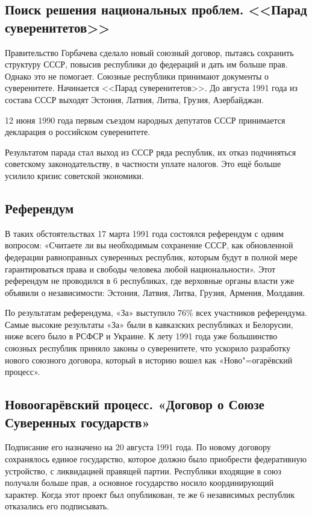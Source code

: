 \subsection{Поиск решения национальных проблем. <<Парад суверенитетов>>}
Правительство Горбачева сделало новый союзный договор, пытаясь сохранить структуру СССР, повысив республики до федераций и дать им больше прав. Однако это не помогает. Союзные республики принимают документы о суверенитете. Начинается <<Парад суверенитетов>>. До августа 1991 года из состава СССР выходят Эстония, Латвия, Литва, Грузия, Азербайджан. 

12 июня 1990 года первым съездом народных депутатов СССР принимается декларация о российском суверенитете.

Результатом парада стал выход из СССР ряда республик, их отказ подчиняться советскому законодательству, в частности уплате налогов. Это ещё больше усилило кризис советской экономики.

\subsection{Референдум}

В таких обстоятельствах 17 марта 1991 года состоялся референдум с одним вопросом: «Считаете ли вы необходимым сохранение СССР, как обновленной федерации равноправных суверенных республик, которым будут в полной мере гарантироваться права и свободы человека любой национальности». Этот референдум не проводился в 6 республиках, где верховные органы власти уже объявили о независимости: Эстония, Латвия, Литва, Грузия, Армения, Молдавия. 

По результатам референдума, «За» выступило 76\% всех участников референдума. Самые высокие результаты «За» были в кавказских республиках и Белорусии, ниже всего было в РСФСР и Украине. К лету 1991 года уже большинство союзных республик приняло законы о суверенитете, что ускорило разработку нового союзного договора, который в историю вошел как «Ново"=огарёвский процесс». 

\subsection{Новоогарёвский процесс. «Договор о Союзе Суверенных государств»}

Подписание его назначено на 20 августа 1991 года. По новому договору сохранялось единое государство, которое должно было приобрести федеративную устройство, с ликвидацией правящей партии. Республики входящие в союз получали больше прав, а основное государство носило координирующий характер. Когда этот проект был опубликован, те же 6 независимых республик отказались его подписывать. 

